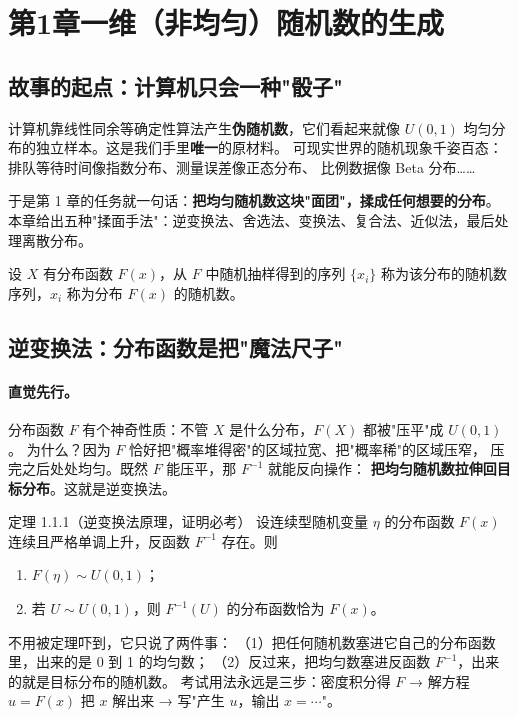 \section{第1章\quad 一维（非均匀）随机数的生成}

\subsection{故事的起点：计算机只会一种"骰子"}

计算机靠线性同余等确定性算法产生\textbf{伪随机数}，它们看起来就像 $U(0,1)$
均匀分布的独立样本。这是我们手里\textbf{唯一}的原材料。
可现实世界的随机现象千姿百态：排队等待时间像指数分布、测量误差像正态分布、
比例数据像 Beta 分布……

于是第 1 章的任务就一句话：\textbf{把均匀随机数这块"面团"，揉成任何想要的分布}。
本章给出五种"揉面手法"：逆变换法、舍选法、变换法、复合法、近似法，最后处理离散分布。

\begin{defn}[随机数]
设 $X$ 有分布函数 $F(x)$，从 $F$ 中随机抽样得到的序列 $\{x_i\}$ 称为该分布的随机数序列，$x_i$ 称为分布 $F(x)$ 的随机数。
\end{defn}

\subsection{逆变换法：分布函数是把"魔法尺子"}

\paragraph{直觉先行。}
分布函数 $F$ 有个神奇性质：不管 $X$ 是什么分布，$F(X)$ 都被"压平"成 $U(0,1)$。
为什么？因为 $F$ 恰好把"概率堆得密"的区域拉宽、把"概率稀"的区域压窄，
压完之后处处均匀。既然 $F$ 能压平，那 $F^{-1}$ 就能反向操作：
\textbf{把均匀随机数拉伸回目标分布}。这就是逆变换法。

\begin{kbox}{定理 1.1.1（逆变换法原理，证明必考）}
设连续型随机变量 $\eta$ 的分布函数 $F(x)$ 连续且严格单调上升，反函数 $F^{-1}$ 存在。则
\begin{enumerate}[leftmargin=2em]
  \item $F(\eta)\sim U(0,1)$；
  \item 若 $U\sim U(0,1)$，则 $F^{-1}(U)$ 的分布函数恰为 $F(x)$。
\end{enumerate}
\end{kbox}

\begin{pbox}
不用被定理吓到，它只说了两件事：
（1）把任何随机数塞进它自己的分布函数里，出来的是 0 到 1 的均匀数；
（2）反过来，把均匀数塞进反函数 $F^{-1}$，出来的就是目标分布的随机数。
考试用法永远是三步：密度积分得 $F$ → 解方程 $u=F(x)$ 把 $x$ 解出来 →
写"产生 $u$，输出 $x=\cdots$"。
\end{pbox}

